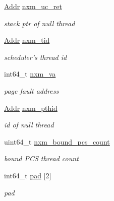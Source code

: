 \begin{DoxyCompactItemize}
\hyperlink{base_2types_8hh_af1bb03d6a4ee096394a6749f0a169232}{Addr} \hyperlink{structTru64_1_1nxm__sched__state_a2321cce735687222b55d66da9530112f}{nxm\_\-uc\_\-ret}
\begin{DoxyCompactList}\small\item\em stack ptr of null thread \item\end{DoxyCompactList}\item 
\hyperlink{base_2types_8hh_af1bb03d6a4ee096394a6749f0a169232}{Addr} \hyperlink{structTru64_1_1nxm__sched__state_ab037907b00a7ae4bbb8c8a1ad8e1cbcd}{nxm\_\-tid}
\begin{DoxyCompactList}\small\item\em scheduler's thread id \item\end{DoxyCompactList}\item 
int64\_\-t \hyperlink{structTru64_1_1nxm__sched__state_ae84de29884ab739a856f7a85c13a55c2}{nxm\_\-va}
\begin{DoxyCompactList}\small\item\em page fault address \item\end{DoxyCompactList}\item 
\hyperlink{base_2types_8hh_af1bb03d6a4ee096394a6749f0a169232}{Addr} \hyperlink{structTru64_1_1nxm__sched__state_a9037a44821c821f7098445624b66415e}{nxm\_\-pthid}
\begin{DoxyCompactList}\small\item\em id of null thread \item\end{DoxyCompactList}\item 
uint64\_\-t \hyperlink{structTru64_1_1nxm__sched__state_adbbe482b35936baecb83728927feafa4}{nxm\_\-bound\_\-pcs\_\-count}
\begin{DoxyCompactList}\small\item\em bound PCS thread count \item\end{DoxyCompactList}\item 
int64\_\-t \hyperlink{structTru64_1_1nxm__sched__state_ab80989b0e8ced8520cd836ae8dcd588c}{pad} \mbox{[}2\mbox{]}
\begin{DoxyCompactList}\small\item\em pad \item\end{DoxyCompactList}\end{DoxyCompactItemize}


